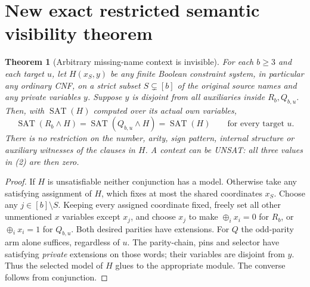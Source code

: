\documentclass[11pt]{article}
\newtheorem{theorem}{Theorem}
\newcommand{\SAT}{\operatorname{SAT}}
\begin{document}
\section{New exact restricted semantic visibility theorem}
\begin{theorem}[Arbitrary missing-name context is invisible]\label{t:missing}
For each $b\ge3$ and each target $u$, let $H(x_S,y)$ be
\emph{any} finite Boolean constraint system, in particular any
ordinary CNF, on a strict subset $S\subsetneq[b]$ of the original
source names and any private variables $y$.
Suppose $y$ is disjoint from all auxiliaries inside $R_b,Q_{b,u}$.
Then, with $\SAT(H)$ computed over its actual own variables,
\[
 \boxed{
 \SAT(R_b\wedge H)=
 \SAT(Q_{b,u}\wedge H)=\SAT(H)
 }
 \qquad\text{for every target }u .
 \tag{2}
\]
There is no restriction on the number, arity, sign pattern,
internal structure or auxiliary witnesses of the clauses in $H$.
A context can be UNSAT: all three values in (2) are then zero.
\end{theorem}
\begin{proof}
If $H$ is unsatisfiable neither conjunction has a model. Otherwise
take any satisfying assignment of $H$, which fixes at most the shared
coordinates $x_S$. Choose any $j\in[b]\setminus S$.
Keeping every assigned coordinate fixed, freely set all other
unmentioned $x$ variables except $x_j$, and choose $x_j$ to make
$\oplus_i x_i=0$ for $R_b$, or $\oplus_i x_i=1$
for $Q_{b,u}$. Both desired parities have extensions.
For $Q$ the odd-parity arm alone suffices, regardless of $u$.
The parity-chain, pins and selector have satisfying \emph{private}
extensions on those words; their variables are disjoint from $y$.
Thus the selected model of $H$ glues to the appropriate module.
The converse follows from conjunction. \end{proof}
\end{document}
